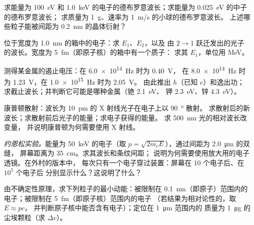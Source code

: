 \begin{exercise}[$\star$]\label{exo:b1:quantum-introduction:3}
求能量为 \qty{100}{eV} 和 \qty{1.0}{keV} 的电子的德布罗意波长；求能量为 \qty{0.025}{eV} 的中子的德布罗意波长；
求质量为 \qty{1}{g}、速率为 \qty{1}{m/s} 的小球的德布罗意波长。
上述哪些粒子能被间距为 \qty{0.2}{nm} 的晶体衍射？
\end{exercise}

\begin{exercise}[$\star$]\label{exo:b1:quantum-introduction:4}
位于宽度为 \qty{1.0}{nm} 的箱中的电子：求 $E_1$、$E_2$，以及
由 $2 \to 1$ 跃迁发出的光子的波长。宽度为 \qty{5}{fm}（即原子核）的箱中有一个质子：
求其 $E_1$，单位用 \unit{MeV}。
\end{exercise}

\begin{exercise}[$\star\star$]\label{exo:b1:quantum-introduction:5}
测得某金属的遏止电压：在 \qty{6.0e14}{Hz} 时为 \qty{0.40}{V}，
在 \qty{8.0e14}{Hz} 时为 \qty{1.23}{V}，在 \qty{1.0e15}{Hz} 时为 \qty{2.05}{V}。
由此推出 $h$（已知 $e$）和逸出功；
求截止波长；并判断它可能是哪种金属（铯 \qty{2.1}{eV}、
钾 \qty{2.3}{eV}、锌 \qty{4.3}{eV}）。
\end{exercise}

\begin{exercise}[$\star\star$]\label{exo:b1:quantum-introduction:6}
康普顿散射：波长为 \qty{10}{pm} 的 X 射线光子在电子上以 \qty{90}{\degree} 散射。
求散射后的新波长；求散射前后光子的能量；求电子获得的能量。
求 \qty{500}{nm} 光的相对波长改变量，
并说明康普顿为何需要使用 X 射线。
\end{exercise}

\begin{exercise}[$\star\star$]\label{exo:b1:quantum-introduction:7}
\emph{约恩松实验。}能量为 \qty{50}{keV} 的电子（取 $p =
\sqrt{2m_eE}$），通过间距为 \qty{2.0}{\micro m} 的双缝，
屏幕距离为 \qty{35}{cm}。求其波长和条纹间距；
说明为何需要使用放大用的电子透镜。在外村的版本中，
每次只有一个电子穿过装置：屏幕在 10 个电子后、在 $10^5$ 个电子后
分别显示什么？这说明了什么？
\end{exercise}

\begin{exercise}[$\star\star$]\label{exo:b1:quantum-introduction:8}
由不确定性原理，求下列粒子的最小动能：被限制在
\qty{0.1}{nm}（即原子）范围内的电子；被限制在 \qty{5}{fm}（即原子核）范围内的电子
（若结果为相对论性的，取 $E \approx pc$，
并判断原子核中能否含有电子）；定位在 \qty{1}{\micro m} 范围内的
质量为 \qty{1}{\micro g} 的尘埃颗粒（求 $\Delta v$）。
\end{exercise}

